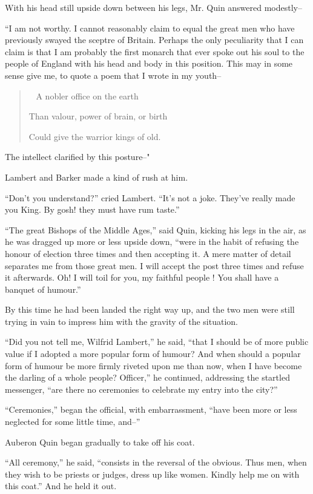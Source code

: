 \documentclass{book}
\newenvironment{mdblockquote}{%
  \begin{quotation}
    \
}{%
  \end{quotation}
}
\begin{document}
With his head still upside down between his legs, Mr. Quin answered modestly–

“I am not worthy. I cannot reasonably claim to equal the great men who have previously swayed the sceptre of Britain. Perhaps the only peculiarity that I can claim is that I am probably the first monarch that ever spoke out his soul to the people of England with his head and body in this position. This may in some sense give me, to quote a poem that I wrote in my youth–

\begin{mdblockquote}
	A nobler office on the earth

	Than valour, power of brain, or birth

	Could give the warrior kings of old.


\end{mdblockquote}
The intellect clarified by this posture–"

Lambert and Barker made a kind of rush at him.

“Don’t you understand?” cried Lambert. “It’s not a joke. They’ve really made you King. By gosh! they must have rum taste.”

“The great Bishops of the Middle Ages,” said Quin, kicking his legs in the air, as he was dragged up more or less upside down, “were in the habit of refusing the honour of election three times and then accepting it. A mere matter of detail separates me from those great men. I will accept the post three times and refuse it afterwards. Oh! I will toil for you, my faithful people ! You shall have a banquet of humour.”

By this time he had been landed the right way up, and the two men were still trying in vain to impress him with the gravity of the situation.

“Did you not tell me, Wilfrid Lambert,” he said, “that I should be of more public value if I adopted a more popular form of humour? And when should a popular form of humour be more firmly riveted upon me than now, when I have become the darling of a whole people? Officer,” he continued, addressing the startled messenger, “are there no ceremonies to celebrate my entry into the city?”

“Ceremonies,” began the official, with embarrassment, “have been more or less neglected for some little time, and–”

Auberon Quin began gradually to take off his coat.

“All ceremony,” he said, “consists in the reversal of the obvious. Thus men, when they wish to be priests or judges, dress up like women. Kindly help me on with this coat.” And he held it out.
\end{document}
